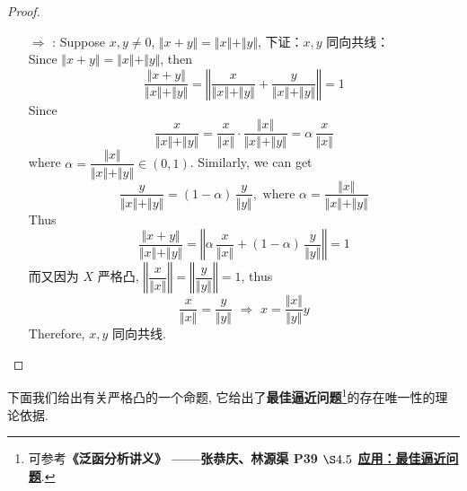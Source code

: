 \begin{proposition}
\begin{proof}
\begin{enumerate}
				\item[$\Rightarrow$]: Suppose $x , y \neq 0$, $\Vert x + y \Vert = \Vert x \Vert + \Vert y \Vert$, 下证：$x , y$ 同向共线：\\
				Since $\Vert x + y \Vert = \Vert x \Vert + \Vert y \Vert$, then
				\[ 
				\frac{\Vert x + y \Vert}{\Vert x \Vert + \Vert y \Vert} 
				= \left\Vert \frac{x}{\Vert x \Vert + \Vert y \Vert} + \frac{y}{\Vert x \Vert + \Vert y \Vert}  \right\Vert 
				= 1
				\]
				Since
				\[ \frac{x}{\Vert x \Vert + \Vert y \Vert} 
				= \frac{x}{\Vert x \Vert} \cdot \frac{\Vert x \Vert}{\Vert x \Vert + \Vert y \Vert} 
				= \alpha \, \frac{x}{\Vert x \Vert} \]
				where $\alpha = \dfrac{\Vert x \Vert}{\Vert x \Vert + \Vert y \Vert} \in (0 , 1)$. Similarly, we can get
				\[ \frac{y}{\Vert x \Vert + \Vert y \Vert} = (1 - \alpha) \, \frac{y}{\Vert y \Vert} , \,\, \text{where} \,\, \alpha = \frac{\Vert x \Vert}{\Vert x \Vert + \Vert y \Vert} \]
				Thus
				\[ 
				\frac{\Vert x + y \Vert}{\Vert x \Vert + \Vert y \Vert} 
				= \left\Vert \alpha \, \frac{x}{\Vert x \Vert} + (1 - \alpha) \, \frac{y}{\Vert y \Vert} \right\Vert 
				= 1 
				\]
				而又因为 $X$ 严格凸, $\left\Vert \dfrac{x}{\Vert x \Vert} \right\Vert = \left\Vert \dfrac{y}{\Vert y \Vert} \right\Vert = 1$, thus 
				\[ \frac{x}{\Vert x \Vert} = \frac{y}{\Vert y \Vert} \,\, \Rightarrow \,\, x = \frac{\Vert x \Vert}{\Vert y \Vert} y \]
				Therefore, $x , y$ 同向共线.
			\end{enumerate}
		\end{proof}
	\end{proposition}

	\vspace{6em}
	
	下面我们给出有关严格凸的一个命题, 它给出了\textbf{最佳逼近问题}\footnote{可参考\textbf{《泛函分析讲义》 ——张恭庆、林源渠 P39 $\S 4.5$ \underline{应用：最佳逼近问题}}.}的存在唯一性的理论依据. 
	
	\vspace{1em}
	
